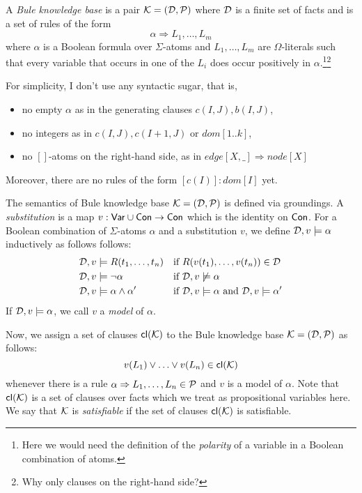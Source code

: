 \documentclass{article}
\begin{document}
A \emph{Bule knowledge base} is a pair $\mathcal{K}=(\mathcal{D},\mathcal{P})$ where $\mathcal{D}$ is a
finite set of facts and \Pmc is a set of rules of the form 
%
\[\alpha \Rightarrow L_1,\ldots,L_m\]
%
where $\alpha$ is a Boolean formula over $\Sigma$-atoms
and $L_1,\ldots,L_m$ are $\Omega$-literals such that every variable
that occurs in one of the $L_i$ does occur positively in
$\alpha$.\footnote{Here we would need the definition of the
  \emph{polarity} of a variable in a Boolean combination of
atoms.}\footnote{Why only clauses on the right-hand side?}
{\color{red}For simplicity, I don't use any syntactic sugar, that is,
%
\begin{itemize}

  \item no empty $\alpha$ as in the generating clauses
    $c(I,J),b(I,J)$,

  \item no integers as in $c(I,J),c(I+1,J)$ or $dom[1..k]$,

  \item no $[]$-atoms on the right-hand side, as in $edge[X,\_ ]
    \Rightarrow node[X]$

\end{itemize}
Moreover, there are no rules of the form $[c(I)]:dom[I]$ yet. 
}

The semantics of Bule knowledge base $\mathcal{K}=(\mathcal{D},\mathcal{P})$ is defined via
groundings. A \emph{substitution} is a map
$v:\mathsf{Var}\cup\mathsf{Con}\to\mathsf{Con}$ which is the identity on
$\mathsf{Con}$. For a Boolean combination of $\Sigma$-atoms $\alpha$ and a
substitution $v$, we define $\mathcal{D},v\models \alpha$ inductively as
follows follows: 
%
\begin{align*}
  \mathcal{D},v & \models R(t_1,\ldots,t_n) && \text{if
  $R(v(t_1),\ldots,v(t_n))\in \mathcal{D}$} \\
  \mathcal{D}, v& \models \neg \alpha && \text{if $\mathcal{D},v\not\models \alpha$}
  \\
  \mathcal{D}, v& \models \alpha \wedge \alpha' && \text{if $\mathcal{D},v\models
  \alpha$ and $\mathcal{D},v\models\alpha'$}
\end{align*}
%
If $\mathcal{D},v\models\alpha$, we call $v$ a \emph{model} of $\alpha$.

Now, we assign a set of clauses $\mathsf{cl}(\mathcal{K})$ to the Bule knowledge
base $\mathcal{K}=(\mathcal{D},\mathcal{P})$ as follows:
%
\[v(L_1)\vee\ldots\vee v(L_n)\in \mathsf{cl}(\mathcal{K})\]
%
whenever there is a rule $\alpha \Rightarrow L_1,\ldots,L_n\in\mathcal{P}$ and $v$ is a
model of $\alpha$. Note that $\mathsf{cl}(\mathcal{K})$ is a set of clauses over
facts which we treat as propositional variables here.  We say that
$\mathcal{K}$ is \emph{satisfiable} if the set of clauses $\mathsf{cl}(\mathcal{K})$ is
satisfiable. 
\end{document}
